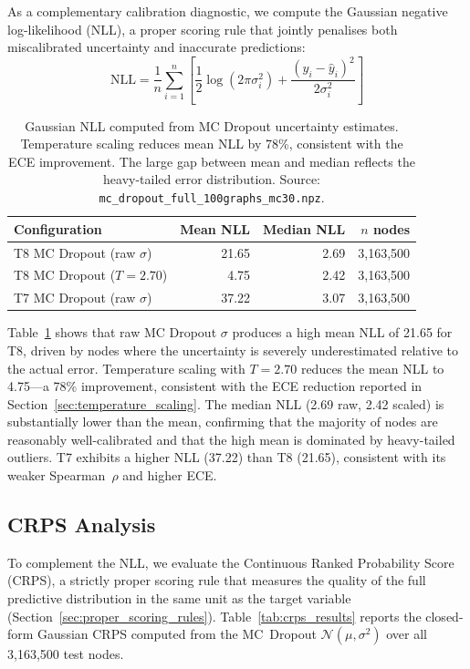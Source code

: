 As a complementary calibration diagnostic, we compute the Gaussian negative log-likelihood (NLL), a proper scoring rule that jointly penalises both miscalibrated uncertainty and inaccurate predictions:
\begin{equation}
    \text{NLL} = \frac{1}{n}\sum_{i=1}^{n}\left[\frac{1}{2}\log(2\pi\sigma_i^2) + \frac{(y_i - \hat{y}_i)^2}{2\sigma_i^2}\right]
\end{equation}

\begin{table}[htbp]
\centering
\caption[Gaussian NLL for MC Dropout uncertainty]{Gaussian NLL computed from MC Dropout uncertainty estimates. Temperature scaling reduces mean NLL by 78\%, consistent with the ECE improvement. The large gap between mean and median reflects the heavy-tailed error distribution. Source: \texttt{mc\_dropout\_full\_100graphs\_mc30.npz}.}
\label{tab:nll_results}
\begin{tabular}{lrrr}
\toprule
\textbf{Configuration} & \textbf{Mean NLL} & \textbf{Median NLL} & \textbf{$n$ nodes} \\
\midrule
T8 MC Dropout (raw $\sigma$) & 21.65 & 2.69 & 3,163,500 \\
T8 MC Dropout ($T = 2.70$) & 4.75 & 2.42 & 3,163,500 \\
T7 MC Dropout (raw $\sigma$) & 37.22 & 3.07 & 3,163,500 \\
\bottomrule
\end{tabular}
\end{table}

Table~\ref{tab:nll_results} shows that raw MC Dropout $\sigma$ produces a high mean NLL of 21.65 for T8, driven by nodes where the uncertainty is severely underestimated relative to the actual error. Temperature scaling with $T = 2.70$ reduces the mean NLL to 4.75---a 78\% improvement, consistent with the ECE reduction reported in Section~\ref{sec:temperature_scaling}. The median NLL (2.69 raw, 2.42 scaled) is substantially lower than the mean, confirming that the majority of nodes are reasonably well-calibrated and that the high mean is dominated by heavy-tailed outliers. T7 exhibits a higher NLL (37.22) than T8 (21.65), consistent with its weaker Spearman~$\rho$ and higher ECE.

\subsection{CRPS Analysis}\label{sec:crps_results}

To complement the NLL, we evaluate the Continuous Ranked Probability Score (CRPS), a strictly proper scoring rule that measures the quality of the full predictive distribution in the same unit as the target variable (Section~\ref{sec:proper_scoring_rules}). Table~\ref{tab:crps_results} reports the closed-form Gaussian CRPS computed from the MC~Dropout $\mathcal{N}(\mu, \sigma^2)$ over all 3,163,500 test nodes.

